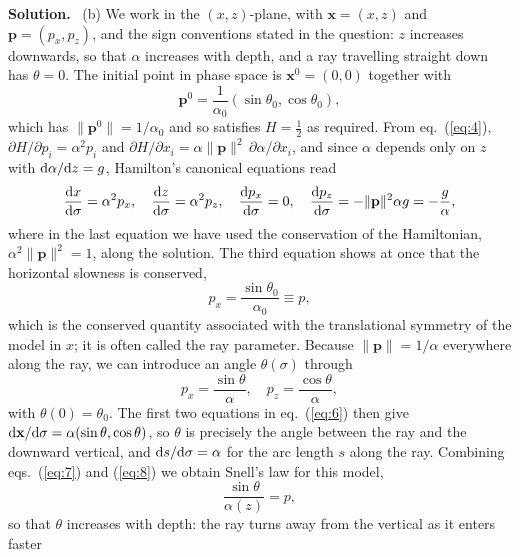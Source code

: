 \documentclass[a4paper,12pt]{paper}
\newenvironment{solution}{\par\noindent\textbf{Solution.}\ }{\par\medskip}
\begin{document}
\begin{solution}
\noindent (b) We work in the $(x,z)$-plane, with $\mathbf{x}=(x,z)$ and $\mathbf{p}=(p_{x},p_{z})$,
and the sign conventions stated in the question: $z$ increases downwards, so that $\alpha$
increases with depth, and a ray travelling straight down has $\theta=0$. The initial point in phase
space is $\mathbf{x}^{0}=(0,0)$ together with
\begin{equation}
\mathbf{p}^{0}=\frac{1}{\alpha_{0}}(\sin\theta_{0},\cos\theta_{0}),
\label{eq:5}
\end{equation}
which has $\|\mathbf{p}^{0}\|=1/\alpha_{0}$ and so satisfies $H=\frac{1}{2}$ as required. From
eq.~(\ref{eq:4}), $\partial H/\partial p_{i}=\alpha^{2}p_{i}$ and
$\partial H/\partial x_{i}=\alpha\|\mathbf{p}\|^{2}\,\partial\alpha/\partial x_{i}$, and since
$\alpha$ depends only on $z$ with $\mathrm{d}\alpha/\mathrm{d} z=g$, Hamilton's canonical equations read
\begin{equation}
\frac{\mathrm{d} x}{\mathrm{d}\sigma}=\alpha^{2}p_{x},\quad
\frac{\mathrm{d} z}{\mathrm{d}\sigma}=\alpha^{2}p_{z},\quad
\frac{\mathrm{d} p_{x}}{\mathrm{d}\sigma}=0,\quad
\frac{\mathrm{d} p_{z}}{\mathrm{d}\sigma}=-\|\mathbf{p}\|^{2}\alpha g=-\frac{g}{\alpha},
\label{eq:6}
\end{equation}
where in the last equation we have used the conservation of the Hamiltonian,
$\alpha^{2}\|\mathbf{p}\|^{2}=1$, along the solution. The third equation shows at once that the
horizontal slowness is conserved,
\begin{equation}
p_{x}=\frac{\sin\theta_{0}}{\alpha_{0}}\equiv p,
\label{eq:7}
\end{equation}
which is the conserved quantity associated with the translational symmetry of the model in $x$; it
is often called the ray parameter. Because $\|\mathbf{p}\|=1/\alpha$ everywhere along the ray, we
can introduce an angle $\theta(\sigma)$ through
\begin{equation}
p_{x}=\frac{\sin\theta}{\alpha},\quad p_{z}=\frac{\cos\theta}{\alpha},
\label{eq:8}
\end{equation}
with $\theta(0)=\theta_{0}$. The first two equations in eq.~(\ref{eq:6}) then give
$\mathrm{d}\mathbf{x}/\mathrm{d}\sigma=\alpha(\sin\theta,\cos\theta)$, so $\theta$ is precisely the angle
between the ray and the downward vertical, and $\mathrm{d} s/\mathrm{d}\sigma=\alpha$ for the arc length
$s$ along the ray. Combining eqs.~(\ref{eq:7}) and (\ref{eq:8}) we obtain Snell's law for this
model,
\begin{equation}
\frac{\sin\theta}{\alpha(z)}=p,
\label{eq:9}
\end{equation}
so that $\theta$ increases with depth: the ray turns away from the vertical as it enters faster

\end{solution}
\end{document}
